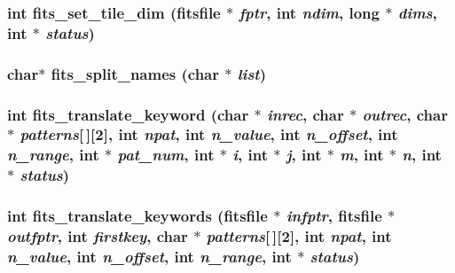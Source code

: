 \subsubsection{\setlength{\rightskip}{0pt plus 5cm}int fits\_\-set\_\-tile\_\-dim (\bf{fitsfile} $\ast$ {\em fptr}, int {\em ndim}, long $\ast$ {\em dims}, int $\ast$ {\em status})}\label{test_2roimasker_2fitsio_8h_a5840c3c6e54c9296de02620cdd196e8}


\subsubsection{\setlength{\rightskip}{0pt plus 5cm}char$\ast$ fits\_\-split\_\-names (char $\ast$ {\em list})}\label{test_2roimasker_2fitsio_8h_2d84c7dd6f7e5375a4b623fb1bc02947}


\subsubsection{\setlength{\rightskip}{0pt plus 5cm}int fits\_\-translate\_\-keyword (char $\ast$ {\em inrec}, char $\ast$ {\em outrec}, char $\ast$ {\em patterns}[$\,$][2], int {\em npat}, int {\em n\_\-value}, int {\em n\_\-offset}, int {\em n\_\-range}, int $\ast$ {\em pat\_\-num}, int $\ast$ {\em i}, int $\ast$ {\em j}, int $\ast$ {\em m}, int $\ast$ {\em n}, int $\ast$ {\em status})}\label{test_2roimasker_2fitsio_8h_df13d3d0ffed68e39ea085c8637f8608}


\subsubsection{\setlength{\rightskip}{0pt plus 5cm}int fits\_\-translate\_\-keywords (\bf{fitsfile} $\ast$ {\em infptr}, \bf{fitsfile} $\ast$ {\em outfptr}, int {\em firstkey}, char $\ast$ {\em patterns}[$\,$][2], int {\em npat}, int {\em n\_\-value}, int {\em n\_\-offset}, int {\em n\_\-range}, int $\ast$ {\em status})}\label{test_2roimasker_2fitsio_8h_2895ae781125419a386901494196d211}


